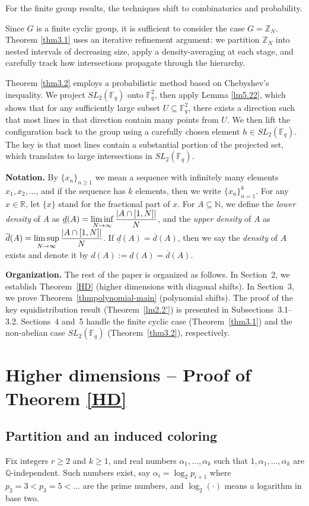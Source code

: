 \documentclass[11pt]{article}
\def\N{{\mathbb  N}}
\theoremstyle{definition}
\begin{document}
For the finite group results, the techniques shift to combinatorics and probability. 

Since $G$ is a finite cyclic group, it is sufficient to consider the case $G=\mathbb{Z}_N$. Theorem \ref{thm3.1} uses an iterative refinement argument: we partition $\mathbb{Z}_N$ into nested intervals of decreasing size, apply a density-averaging at each stage, and carefully track how intersections propagate through the hierarchy. 

Theorem \ref{thm3.2} employs a probabilistic method based on Chebyshev's inequality. We project $SL_2(\mathbb{F}_q)$ onto $\mathbb{F}_q^2$, then apply Lemma \ref{lm5.22}, which shows that for any sufficiently large subset $U \subseteq \mathbb{F}_q^2$, there exists a direction such that most lines in that direction contain many points from $U$. We then lift the configuration back to the group using a carefully chosen element $h \in SL_2(\mathbb{F}_q)$. The key is that most lines contain a substantial portion of the projected set, which translates to large intersections in $SL_2(\mathbb{F}_q)$. 

{\bf Notation.} By $\{x_n\}_{n\ge 1}$ we mean a sequence with infinitely many elements $x_1, x_2, \ldots$, and if the sequence has $k$ elements, then we write $\{x_n\}_{n=1}^k$. For any $x\in \mathbb{R}$, let $\{x\}$ stand for the fractional part of $x$. For $A\subseteq\N$, we define the \emph{lower density} of $A$  as $\underline
d(A)=\displaystyle\liminf_{N\to \infty}{|A\cap[1, N]|\over N}$, and the
\emph{upper density} of $A$ as $\overline d(A)=\displaystyle \limsup_{N\to
\infty}{|A\cap[1, N]|\over N}$. If $\underline d(A)=\overline d(A)$, then we say the \emph{density} of $A$ exists and denote it by $d(A):=\underline d(A)=\overline d(A)$.

\textbf{Organization.} The rest of the paper is organized as follows. In Section~2, we establish Theorem~\ref{HD} (higher dimensions with diagonal shifts). In Section~3, we prove Theorem~\ref{thmpolynomial-main} (polynomial shifts). The proof of the key equidistribution result (Theorem~\ref{lm2.2'}) is presented in Subsections~3.1--3.2. Sections~4 and~5 handle the finite cyclic case (Theorem~\ref{thm3.1}) and the non-abelian case \(SL_2(\mathbb{F}_q)\) (Theorem~\ref{thm3.2}), respectively.

\section{Higher dimensions -- Proof of Theorem \ref{HD}}
\subsection{Partition and an induced coloring}
Fix integers $r\ge2$ and $k\ge1$, and real numbers $\alpha_1,\dots,\alpha_k$ such that
$1,\alpha_1,\dots,\alpha_k$ are $\mathbb Q$-independent.
Such numbers exist, say $\alpha_i=\log_2 p_{i+1}$ where $p_2=3<p_3=5<\dots$ are the prime numbers, and $\log_2(\cdot)$ means a logarithm in base two.
\end{document}

